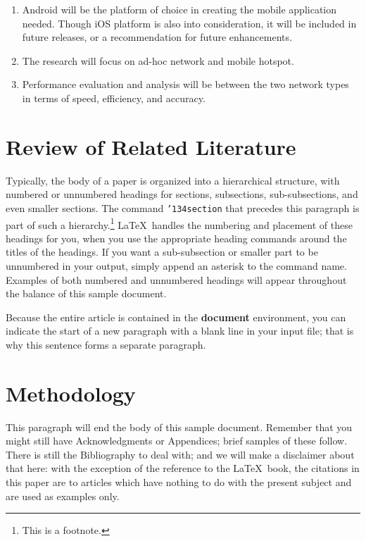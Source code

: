\begin{enumerate}
\begin{enumerate}
	\item Android will be the platform of choice in creating the mobile application needed. Though iOS platform is also into consideration, it will be included in future releases, or a recommendation for future enhancements.
	\item The research will focus on ad-hoc network and mobile hotspot. 
	\item Performance evaluation and analysis will be between the two network types in terms of speed, efficiency, and accuracy.
\end{enumerate}

\section{Review of Related Literature}
Typically, the body of a paper is organized into a hierarchical
structure, with numbered or unnumbered headings for sections,
subsections, sub-subsections, and even smaller sections.  The command
\texttt{{\char'134}section} that precedes this paragraph is part of
such a hierarchy.\footnote{This is a footnote.} \LaTeX\ handles the
numbering and placement of these headings for you, when you use the
appropriate heading commands around the titles of the headings.  If
you want a sub-subsection or smaller part to be unnumbered in your
output, simply append an asterisk to the command name.  Examples of
both numbered and unnumbered headings will appear throughout the
balance of this sample document.

Because the entire article is contained in the \textbf{document}
environment, you can indicate the start of a new paragraph with a
blank line in your input file; that is why this sentence forms a
separate paragraph.

\section{Methodology}
This paragraph will end the body of this sample document.
Remember that you might still have Acknowledgments or
Appendices; brief samples of these
follow.  There is still the Bibliography to deal with; and
we will make a disclaimer about that here: with the exception
of the reference to the \LaTeX\ book, the citations in
this paper are to articles which have nothing to
do with the present subject and are used as
examples only.

\appendix

\end{enumerate}
